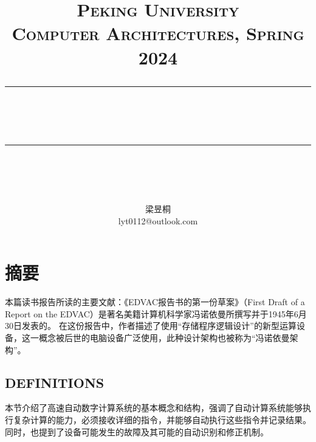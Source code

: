\documentclass[12pt]{article} %
\theoremstyle{definition}
\newcommand{\horrule}[1]{\rule[0.5ex]{\linewidth}{#1}} 	%
\begin{document}
\title{
{\normalfont\normalsize\textsc{
Peking University\\
Computer Architectures, Spring 2024 \\[25pt]}}
\horrule{0.5pt}\\
\horrule{1.8pt}\\[20pt]
}
\author{梁昱桐\\lyt0112@outlook.com}

\begin{titlepage}
\maketitle
\vspace{30pt}


\thispagestyle{empty}
\end{titlepage}

\tableofcontents
\thispagestyle{empty}

\newpage
\setcounter{page}{1}

\section{摘要}

本篇读书报告所读的主要文献：《EDVAC报告书的第一份草案》（First Draft of a Report on the EDVAC）是著名美籍计算机科学家冯诺依曼所撰写并于1945年6月30日发表的。
在这份报告中，作者描述了使用“存储程序逻辑设计”的新型运算设备，这一概念被后世的电脑设备广泛使用，此种设计架构也被称为“冯诺依曼架构”。\cite{vonNeumann1945edvac}

\subsection{DEFINITIONS}

本节介绍了高速自动数字计算系统的基本概念和结构，强调了自动计算系统能够执行复杂计算的能力，必须接收详细的指令，并能够自动执行这些指令并记录结果。
同时，也提到了设备可能发生的故障及其可能的自动识别和修正机制。
\end{document}

